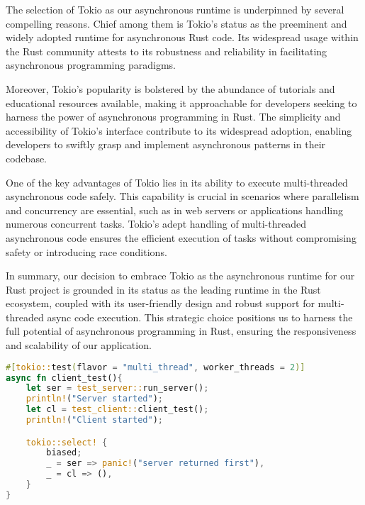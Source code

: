 The selection of Tokio as our asynchronous runtime is underpinned by several compelling reasons. Chief among them is Tokio's status as the preeminent and widely
adopted runtime for asynchronous Rust code. Its widespread usage within the Rust community attests to its robustness and reliability in facilitating asynchronous
programming paradigms.\newline

Moreover, Tokio's popularity is bolstered by the abundance of tutorials and educational resources available, making it approachable for developers seeking to 
harness the power of asynchronous programming in Rust. The simplicity and accessibility of Tokio's interface contribute to its widespread adoption, enabling 
developers to swiftly grasp and implement asynchronous patterns in their codebase.\newline

One of the key advantages of Tokio lies in its ability to execute multi-threaded asynchronous code safely. This capability is crucial in scenarios where 
parallelism and concurrency are essential, such as in web servers or applications handling numerous concurrent tasks. Tokio's adept handling of multi-threaded 
asynchronous code ensures the efficient execution of tasks without compromising safety or introducing race conditions.\newline


In summary, our decision to embrace Tokio as the asynchronous runtime for our Rust project is grounded in its status as the leading runtime in the Rust 
ecosystem, coupled with its user-friendly design and robust support for multi-threaded async code execution. This strategic choice positions us to harness the 
full potential of asynchronous programming in Rust, ensuring the responsiveness and scalability of our application.

\begin{minipage}{\textwidth}
\begin{lstlisting}[language=Rust]
#[tokio::test(flavor = "multi_thread", worker_threads = 2)]
async fn client_test(){ 
    let ser = test_server::run_server();
    println!("Server started");
    let cl = test_client::client_test();
    println!("Client started");

    tokio::select! {
        biased; 
        _ = ser => panic!("server returned first"),
        _ = cl => (),
    }           
}
\end{lstlisting}
\end{minipage}

